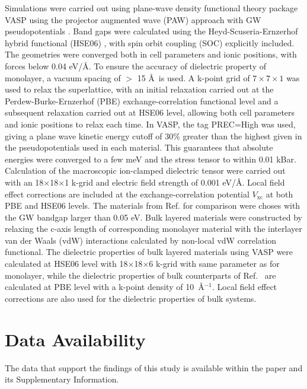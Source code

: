 \documentclass[journal=ancac3,manuscript=article,email=true,hyperref=true,keywords=false]{achemso}
\begin{document}
Simulations were carried out using plane-wave density functional
theory package VASP \cite{Kresse_1993,Kresse_1996_1,Kresse_1996_2}
using the projector augmented wave (PAW) approach with GW
pseudopotentials \cite{Kresse_1999_pseudopotentials}. Band gaps were
calculated using the Heyd-Scuseria-Ernzerhof hybrid functional (HSE06)
\cite{Heyd_2003,HSE_2006}, with spin orbit coupling (SOC) explicitly
included. The geometries were converged both in cell parameters and
ionic positions, with forces below 0.04 eV/\AA. To ensure the accuracy
of dielectric property of monolayer, a vacuum spacing of $>$ 15 \AA~is
used. A k-point grid of \(7\times7\times1\) was used to relax the
superlattice, with an initial relaxation carried out at the
Perdew-Burke-Ernzerhof
(PBE)\cite{Perdew_1996,Ernzerhof99,Paier_2005_PBE}
exchange-correlation functional level and a subsequent relaxation
carried out at HSE06 level, allowing both cell parameters and ionic
positions to relax each time. In VASP, the tag PREC=High was used,
giving a plane wave kinetic energy cutoff of 30\% greater than the
highest given in the pseudopotentials used in each material. This
guarantees that absolute energies were converged to a few meV and the
stress tensor to within 0.01 kBar.  Calculation of the macroscopic
ion-clamped dielectric tensor were carried out with an
18$\times$18$\times$1 k-grid and electric field strength of 0.001
eV/\AA.  Local field effect corrections are included at the
exchange-correlation potential $V_{\mathrm{xc}}$ at both PBE and HSE06
levels. The materials from Ref. for comparison
were choses with the GW bandgap larger than 0.05 eV. Bulk layered
materials were constructed by relaxing the c-axis length of
corresponding monolayer material with the interlayer van der Waals
(vdW) interactions calculated by non-local vdW correlation
functional\cite{Lee_2010_vdFD2}.  The dielectric properties of bulk
layered materials using VASP were calculated at HSE06 level with
18$\times$18$\times$6 k-grid with same parameter as for monolayer,
while the dielectric properties of bulk counterparts of
Ref.~ are calculated at PBE level with a
k-point density of 10~\AA$^{-1}$. Local field effect corrections are
also used for the dielectric properties of bulk systems.



\section*{Data Availability}
The data that support the findings of this study 
is available within the paper and its Supplementary Information.  
\end{document}
